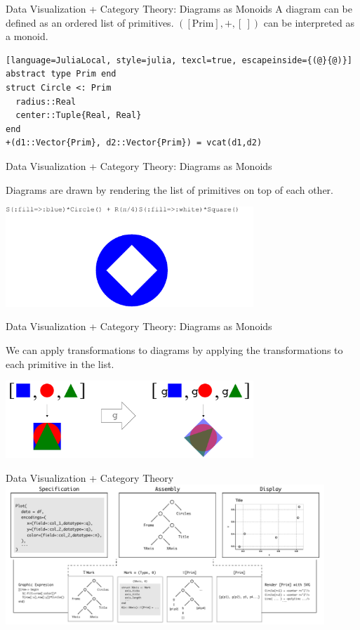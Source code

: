 \documentclass[aspectratio=169,xcolor=dvipsnames,10pt]{beamer}
\theoremstyle{definition}
\begin{document}
\begin{frame}[fragile]{Data Visualization + Category Theory: Diagrams as Monoids}
    A diagram can be defined as an ordered list of primitives.
    $( [\text{Prim}] , +, [\ ] )$ can be interpreted as a monoid.
\begin{lstlisting}[language=JuliaLocal, style=julia, texcl=true, escapeinside={(@}{@)}]
abstract type Prim end
struct Circle <: Prim
  radius::Real
  center::Tuple{Real, Real}
end
+(d1::Vector{Prim}, d2::Vector{Prim}) = vcat(d1,d2)
\end{lstlisting}
\end{frame}

\begin{frame}[fragile]{Data Visualization + Category Theory: Diagrams as Monoids}

    Diagrams are drawn by rendering the list of primitives on top of each other.
    \begin{center}
        \includegraphics[width=0.7\textwidth]{./figs/simplediagram.pdf}
    \end{center}
\end{frame}

\begin{frame}[fragile]{Data Visualization + Category Theory: Diagrams as Monoids}

  We can apply transformations to diagrams by applying the
  transformations to each primitive in the list.
    \begin{center}
        \includegraphics[width=0.7\textwidth]{./figs/diagramtransformation.pdf}
    \end{center}
\end{frame}

\begin{frame}[fragile]{Data Visualization + Category Theory}
    \centering
    \includegraphics[width=0.9\textwidth]{figs/pipe.pdf}
\end{frame}
\end{document}
